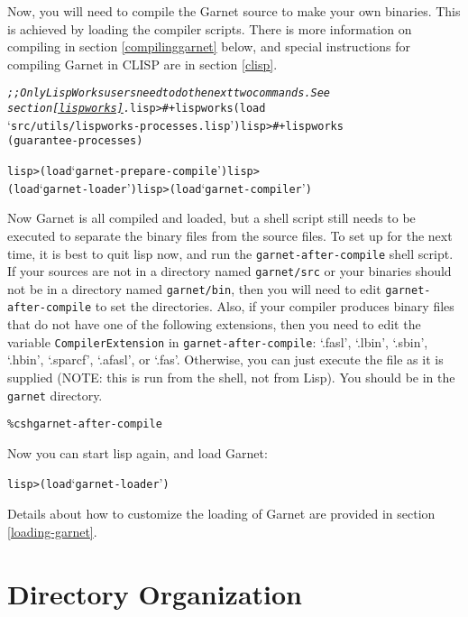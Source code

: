\documentclass{report}
\newenvironment{programexample}{\begin{alltt}}{\end{alltt}}
\begin{document}
Now, you will need to compile the Garnet source to make your own
binaries.  This is achieved by loading the compiler scripts.  There is
more information on compiling in section \ref{compilinggarnet} below,
and special instructions for compiling Garnet in CLISP are in section
\ref{clisp}.
\begin{programexample}
  {\it ;; Only LispWorks users need to do the next two commands.  See
    section \ref{lispworks}.}  lisp> \#+lispworks (load
  `src/utils/lispworks-processes.lisp') lisp> \#+lispworks
  (guarantee-processes)
  
  lisp> (load `garnet-prepare-compile') lisp>
  (load `garnet-loader') lisp> (load `garnet-compiler')
\end{programexample}

Now Garnet is all compiled and loaded, but a shell script still needs
to be executed to separate the binary files from the source files.  To
set up for the next time, it is best to quit lisp now, and run the
\texttt{garnet-after-compile} shell script.  If your sources are not in a
directory named \texttt{garnet/src} or your binaries should not be in a
directory named \texttt{garnet/bin}, then you will need to edit
\texttt{garnet-after-compile} to set the directories.  Also, if your
compiler produces binary files that do not have one of the following
extensions, then you need to edit the variable \texttt{CompilerExtension}
in \texttt{garnet-after-compile}: `.fasl', `.lbin', `.sbin', `.hbin',
`.sparcf', `.afasl', or `.fas'.  Otherwise, you can just execute the
file as it is supplied (NOTE: this is run from the shell, not from
Lisp).  You should be in the \texttt{garnet} directory.
\begin{programexample}
  \% csh garnet-after-compile
\end{programexample}

Now you can start lisp again, and load Garnet:
\begin{programexample}
  lisp> (load `garnet-loader')
\end{programexample}

Details about how to customize the loading of Garnet are provided in
section \ref{loading-garnet}.

\section{Directory Organization}
   
\end{document}
